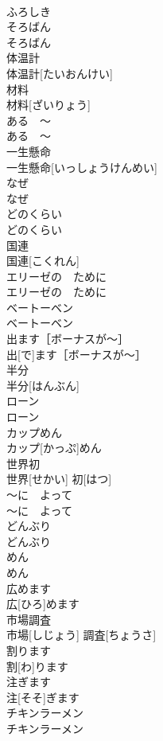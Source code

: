 \documentclass[8pt]{extreport}
\begin{document}
\begin{CJK}{UTF8}{min}
\\	ふろしき	
\\	そろばん	
\\	そろばん	
\\	体温計	
\\	体温計[たいおんけい]	
\\	材料	
\\	材料[ざいりょう]	
\\	ある　〜	
\\	ある　〜	
\\	一生懸命	
\\	一生懸命[いっしょうけんめい]	
\\	なぜ	
\\	なぜ	
\\	どのくらい	
\\	どのくらい	
\\	国連	
\\	国連[こくれん]	
\\	エリーゼの　ために	
\\	エリーゼの　ために	
\\	ベートーベン	
\\	ベートーベン	
\\	出ます［ボーナスが〜］	
\\	出[で]ます［ボーナスが〜］	
\\	半分	
\\	半分[はんぶん]	
\\	ローン	
\\	ローン	
\\	カップめん	
\\	カップ[かっぷ]めん	
\\	世界初	
\\	世界[せかい] 初[はつ]	
\\	〜に　よって	
\\	〜に　よって	
\\	どんぶり	
\\	どんぶり	
\\	めん	
\\	めん	
\\	広めます	
\\	広[ひろ]めます	
\\	市場調査	
\\	市場[しじょう] 調査[ちょうさ]	
\\	割ります	
\\	割[わ]ります	
\\	注ぎます	
\\	注[そそ]ぎます	
\\	チキンラーメン	
\\	チキンラーメン	

\end{CJK}
\end{document}
